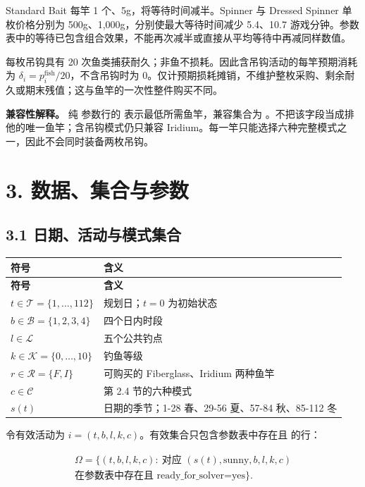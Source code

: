 \documentclass[11pt,a4paper]{article}
\begin{document}
Standard Bait 每竿 1 个、5g，将等待时间减半。Spinner 与 Dressed Spinner 单枚价格分别为 500g、1,000g，分别使最大等待时间减少 5.4、10.7 游戏分钟。参数表中的等待已包含组合效果，不能再次减半或直接从平均等待中再减同样数值。\par

每枚吊钩具有 20 次鱼类捕获耐久；非鱼不损耗。因此含吊钩活动的每竿预期消耗为 $\delta_i=p_i^{\mathrm{fish}}/20$，不含吊钩时为 0。仅计预期损耗摊销，不维护整枚采购、剩余耐久或期末残值；这与鱼竿的一次性整件购买不同。\par

\textbf{兼容性解释。} 纯  参数行的  表示最低所需鱼竿，兼容集合为 。不把该字段当成排他的唯一鱼竿；含吊钩模式仍只兼容 Iridium。每一竿只能选择六种完整模式之一，因此不会同时装备两枚吊钩。\par

\section*{\color{modelblue}3. 数据、集合与参数}

\subsection*{3.1 日期、活动与模式集合}

{\small\begin{longtable}{L{0.23\dimexpr\textwidth-20pt\relax}L{0.77\dimexpr\textwidth-20pt\relax}}\toprule
\textbf{符号} & \textbf{含义}\\\midrule\endfirsthead
\textbf{符号} & \textbf{含义}\\\midrule\endhead
\bottomrule\endfoot
$t\in\mathcal T=\{1,\ldots,112\}$ & 规划日；$t=0$ 为初始状态\\
$b\in\mathcal B=\{1,2,3,4\}$ & 四个日内时段\\
$l\in\mathcal L$ & 五个公共钓点\\
$k\in\mathcal K=\{0,\ldots,10\}$ & 钓鱼等级\\
$r\in\mathcal R=\{F,I\}$ & 可购买的 Fiberglass、Iridium 两种鱼竿\\
$c\in\mathcal C$ & 第 2.4 节的六种模式\\
$s(t)$ & 日期的季节；1-28 春、29-56 夏、57-84 秋、85-112 冬\\
\end{longtable}}

\begin{samepage}
令有效活动为 $i=(t,b,l,k,c)$。有效集合只包含参数表中存在且  的行：\par

\[
\begin{gathered}
\Omega=\{(t,b,l,k,c):\ \text{对应 }(s(t),\mathrm{sunny},b,l,k,c)\\
\text{在参数表中存在且 ready\_for\_solver=yes}\}.
\end{gathered}\tag{D1}
\]
\end{samepage}
\end{document}
